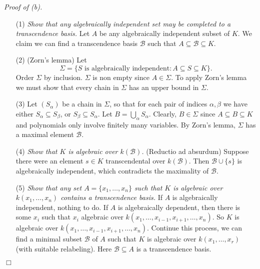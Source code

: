 \documentclass{article}
\begin{document}
\emph{Proof of (b).}
\begin{enumerate}
\item[(1)]
  \emph{Show that any algebraically independent set may be completed to a transcendence basis.}
  Let $A$ be any algebraically independent subset of $K$.
  We claim we can find a transcendence basis $\mathscr{B}$ such that
  $A \subseteq \mathscr{B} \subseteq K$.

\item[(2)]
  (Zorn's lemma)
  Let
  \[
    \Sigma = \{ S \text{ is algebraically independent} : A \subseteq S \subseteq K \}.
  \]
  Order $\Sigma$ by inclusion.
  $\Sigma$ is non empty since $A \in \Sigma$.
  To apply Zorn's lemma we must show that every chain in $\Sigma$ has an upper bound in $\Sigma$.

\item[(3)]
  Let $(S_\alpha)$ be a chain in $\Sigma$,
  so that for each pair of indices $\alpha, \beta$
  we have either $S_\alpha \subseteq S_\beta$, or $S_\beta \subseteq S_\alpha$.
  Let $B = \bigcup_\alpha S_\alpha$.
  Clearly, $B \in \Sigma$ since $A \subseteq B \subseteq K$ and
  polynomials only involve finitely many variables.
  By Zorn's lemma, $\Sigma$ has a maximal element $\mathscr{B}$.

\item[(4)]
  \emph{Show that $K$ is algebraic over $k(\mathscr{B})$.}
  (Reductio ad absurdum)
  Suppose there were an element $s \in K$ transcendental over $k(\mathscr{B})$.
  Then $\mathscr{B} \cup \{ s \}$ is algebraically independent,
  which contradicts the maximality of $\mathscr{B}$.

\item[(5)]
  \emph{Show that any set $A = \{ x_1,\ldots,x_n \}$ such that
  $K$ is algebraic over $k(x_1,\ldots,x_n)$ contains a transcendence basis.}
  If $A$ is algebraically independent, nothing to do.
  If $A$ is algebraically dependent,
  then there is some $x_i$ such that
  $x_i$ algebraic over $k(x_1,\ldots,x_{i-1},x_{i+1},\ldots,x_n)$.
  So $K$ is algebraic over $k(x_1,\ldots,x_{i-1},x_{i+1},\ldots,x_n)$.
  Continue this process, we can find a minimal subset $\mathscr{B}$ of $A$
  such that $K$ is algebraic over $k(x_1,\ldots,x_r)$ (with suitable relabeling).
  Here $\mathscr{B} \subseteq A$ is a transcendence basis.
\end{enumerate}
$\Box$ \\
\end{document}
